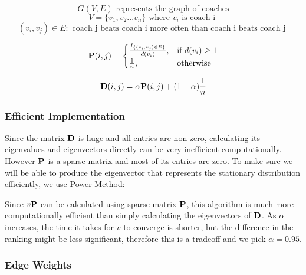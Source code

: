 \documentclass[titlepage,12pt]{article}
\begin{document}
$$G(V, E) \mbox{ represents the graph of coaches}$$
$$V = \{v_1, v_2 ... v_n\} \mbox{ where } v_i \mbox{ is coach i }$$
$$(v_i, v_j) \in E : \mbox{ coach j beats coach i more often than coach i beats coach j }$$



\[
    {\bf P} (i, j)= 
\begin{cases}
    \frac{ I_{\{(v_i, v_j) \in E\}}}{d(v_i)},& \text{if } d(v_i) \geq 1\\
    \frac{1}{n},              & \text{otherwise}
\end{cases}
\]

$${\bf D} (i, j) = \alpha {\bf P} (i, j)  + (1-\alpha)\frac{1}{n}$$


\subsubsection*{Efficient Implementation}


Since the matrix ${\bf D}$ is huge and all entries are non zero, calculating its eigenvalues and eigenvectors directly can be very inefficient computationally. However ${\bf P}$ is a sparse matrix and most of its entries are zero. To make sure we will be able to produce the eigenvector that represents the stationary distribution efficiently, we use Power Method:

\vspace{5mm}

\begin{algorithm}[H]
\begin{algorithmic}
\EndWhile
{}
\end{algorithmic}
\end{algorithm}

\vspace{5mm}

\noindent Since $v {\bf P}$ can be calculated using sparse matrix ${\bf P}$, this algorithm is much more computationally efficient than simply calculating the eigenvectors of ${\bf D}$. As $\alpha$ increases, the time it takes for $v$ to converge is shorter, but the difference in the ranking might be less significant, therefore this is a tradeoff and we pick $\alpha = 0.95$.

\subsubsection*{Edge Weights}
\end{document}
